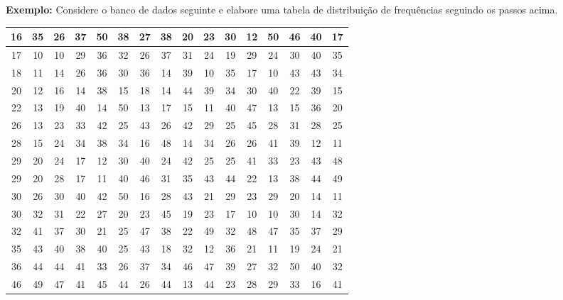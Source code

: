 \documentclass{article}
\begin{document}
{\bf Exemplo:} Considere o banco de dados seguinte e elabore uma tabela de distribuição de frequências seguindo os passos acima.

\begin{table}[htb]
  \centering
    \begin{tabular}{|c|c|c|c|c|c|c|c|c|c|c|c|c|c|c|c|}
    \hline
    16    & 35    & 26    & 37    & 50    & 38    & 27    & 38    & 20    & 23    & 30    & 12    & 50    & 46    & 40    & 17 \\
    \hline
    17    & 10    & 10    & 29    & 36    & 32    & 26    & 37    & 31    & 24    & 19    & 29    & 24    & 30    & 40    & 35 \\
    \hline
    18    & 11    & 14    & 26    & 36    & 30    & 36    & 14    & 39    & 10    & 35    & 17    & 10    & 43    & 43    & 34 \\
    \hline
    20    & 12    & 16    & 14    & 38    & 15    & 18    & 14    & 44    & 39    & 34    & 30    & 40    & 22    & 39    & 15 \\
    \hline
    22    & 13    & 19    & 40    & 14    & 50    & 13    & 17    & 15    & 11    & 40    & 47    & 13    & 15    & 36    & 20 \\
    \hline
    26    & 13    & 23    & 33    & 42    & 25    & 43    & 26    & 42    & 29    & 25    & 45    & 28    & 31    & 28    & 25 \\
    \hline
    28    & 15    & 24    & 34    & 38    & 34    & 16    & 48    & 14    & 34    & 26    & 26    & 41    & 39    & 12    & 11 \\
    \hline
    29    & 20    & 24    & 17    & 12    & 30    & 40    & 24    & 42    & 25    & 25    & 41    & 33    & 23    & 43    & 48 \\
    \hline
    29    & 20    & 28    & 17    & 11    & 40    & 46    & 31    & 35    & 43    & 44    & 22    & 13    & 38    & 44    & 49 \\
    \hline
    30    & 26    & 30    & 40    & 42    & 50    & 16    & 28    & 43    & 21    & 29    & 23    & 29    & 20    & 14    & 11 \\
    \hline
    30    & 32    & 31    & 22    & 27    & 20    & 23    & 45    & 19    & 23    & 17    & 10    & 10    & 30    & 14    & 32 \\
    \hline
    32    & 41    & 37    & 30    & 21    & 25    & 47    & 38    & 22    & 49    & 32    & 48    & 47    & 35    & 37    & 29 \\
    \hline
    35    & 43    & 40    & 38    & 40    & 25    & 43    & 18    & 32    & 12    & 36    & 21    & 11    & 19    & 24    & 21 \\
    \hline
    36    & 44    & 44    & 41    & 33    & 26    & 37    & 34    & 46    & 47    & 39    & 27    & 32    & 50    & 40    & 32 \\
    \hline
    46    & 49    & 47    & 41    & 45    & 44    & 26    & 44    & 13    & 44    & 23    & 28    & 29    & 33    & 16    & 41 \\
    \hline
    \end{tabular}%
  \label{tab:addlabel}%
\end{table}%
\end{document}
